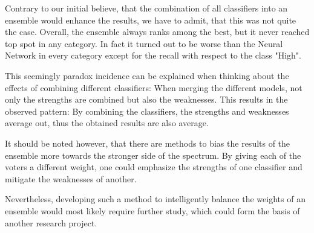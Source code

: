 Contrary to our initial believe, that the combination of all
classifiers into an ensemble would enhance the results, we have to
admit, that this was not quite the case. Overall, the ensemble always
ranks among the best, but it never reached top spot in any
category. In fact it turned out to be worse than the Neural Network in
every category except for the recall with respect to the class "High".

This seemingly paradox incidence can be explained when
thinking about the effects of combining different classifiers: When
merging the different models, not only the strengths are combined but
also the weaknesses. This results in the observed pattern: By
combining the classifiers, the strengths and weaknesses average out,
thus the obtained results are also average.

It should be noted however, that there are methods to bias the results
of the ensemble more towards the stronger side of the spectrum.
By giving each of the voters a different weight, one could emphasize the
strengths of one classifier and mitigate the weaknesses of
another.

\noindent Nevertheless, developing such a method to intelligently balance the weights of an
ensemble would most likely require further study, which
could form the basis of another research project.
